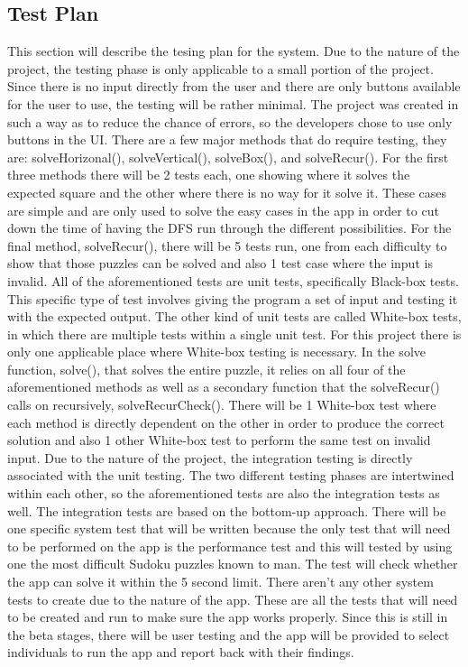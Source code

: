 \documentclass{article}
\begin{document}
\subsection{Test Plan}
This section will describe the tesing plan for the system. Due to the nature of the project, the testing phase is only applicable to a small portion of the project. Since there is no input directly from the user and there are only buttons available for the user to use, the testing will be rather minimal. The project was created in such a way as to reduce the chance of errors, so the developers chose to use only buttons in the UI. There are a few major methods that do require testing, they are: solveHorizonal(), solveVertical(), solveBox(), and solveRecur(). For the first three methods there will be 2 tests each, one showing where it solves the expected square and the other where there is no way for it solve it. These cases are simple and are only used to solve the easy cases in the app in order to cut down the time of having the DFS run through the different possibilities. For the final method, solveRecur(), there will be 5 tests run, one from each difficulty to show that those puzzles can be solved and also 1 test case where the input is invalid. All of the aforementioned tests are unit tests, specifically Black-box tests. This specific type of test involves giving the program a set of input and testing it with the expected output. The other kind of unit tests are called White-box tests, in which there are multiple tests within a single unit test. For this project there is only one applicable place where White-box testing is necessary. In the solve function, solve(), that solves the entire puzzle, it relies on all four of the aforementioned methods as well as a secondary function that the solveRecur() calls on recursively, solveRecurCheck(). There will be 1 White-box test where each method is directly dependent on the other in order to produce the correct solution and also 1 other White-box test to perform the same test on invalid input. Due to the nature of the project, the integration testing is directly associated with the unit testing. The two different testing phases are intertwined within each other, so the aforementioned tests are also the integration tests as well. The integration tests are based on the bottom-up approach. There will be one specific system test that will be written because the only test that will need to be performed on the app is the performance test and this will tested by using one the most difficult Sudoku puzzles known to man. The test will check whether the app can solve it within the 5 second limit. There aren't any other system tests to create due to the nature of the app. These are all the tests that will need to be created and run to make sure the app works properly. Since this is still in the beta stages, there will be user testing and the app will be provided to select individuals to run the app and report back with their findings.
\end{document}
